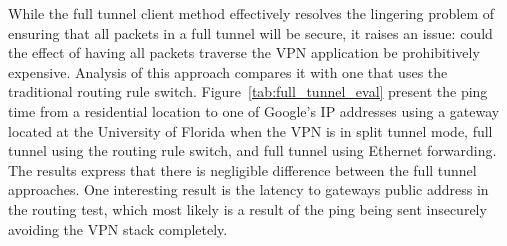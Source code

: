 While the full tunnel client method effectively resolves the lingering problem
of ensuring that all packets in a full tunnel will be secure, it raises an
issue:  could the effect of having all packets traverse the VPN application be
prohibitively expensive.  Analysis of this approach compares it with one that
uses the traditional routing rule switch.  Figure~\ref{tab:full_tunnel_eval}
present the ping time from a residential location to one of Google's IP
addresses using a gateway located at the University of Florida when the VPN is
in split tunnel mode, full tunnel using the routing rule switch, and full
tunnel using Ethernet forwarding.  The results express that there is negligible
difference between the full tunnel approaches.  One interesting result is the
latency to gateways public address in the routing test, which most likely is a
result of the ping being sent insecurely avoiding the VPN stack completely.
